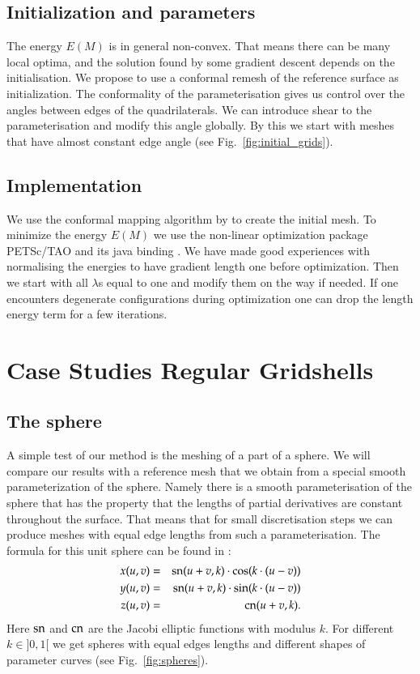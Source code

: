 \documentclass[Thesis.tex]{subfiles}
\begin{document}
\subsection{Initialization and parameters}
The energy $E(M)$ is in general non-convex. That means there can be many local optima, and the solution found by some gradient descent depends on the initialisation. We propose to use a conformal remesh of the reference surface as initialization. The conformality of the parameterisation gives us control over the angles between edges of the quadrilaterals. We can introduce shear to the parameterisation and modify this angle globally. By this we start with meshes that have almost constant edge angle (see Fig.~\ref{fig:initial_grids}).

\subsection{Implementation}
We use the conformal mapping algorithm by \cite{Springborn2008} to create the
initial mesh. To minimize the energy $E(M)$ we use the non-linear optimization package
PETSc/TAO \cite{petsc-web-page,tao-user-ref} and its java binding 
\cite{jpetsctao-web-page}. We have made good experiences with normalising the
 energies to have gradient length one before optimization. Then we start with all
$\lambda$s equal to one and modify them on the way if needed. If one encounters
degenerate configurations during optimization one can drop the length energy term for 
a few iterations.

\section{Case Studies Regular Gridshells}

\subsection{The sphere}
A simple test of our method is the meshing of a part of a sphere. We will compare our results with a reference mesh that we obtain from a special smooth parameterization of the sphere. Namely there is a smooth parameterisation of the sphere that has the property that the lengths of partial derivatives are constant throughout the surface. That means that for small discretisation steps we can produce meshes with equal edge lengths from such a parameterisation. The formula for this unit sphere can be found in \cite{Voss1881}:
\begin{eqnarray*}
	x(u,v)&=&\operatorname{sn}(u+v, k)\cdot \cos(k\cdot (u-v))\\
	y(u,v)&=&\operatorname{sn}(u+v, k)\cdot \sin(k\cdot (u-v))\\
	z(u,v)&=&\operatorname{cn}(u+v, k).
\end{eqnarray*}
Here $\operatorname{sn}$ and $\operatorname{cn}$ are the Jacobi elliptic functions with modulus $k$. For different $k\in ]0,1[$ we get spheres with equal edges lengths and different shapes of parameter curves (see Fig.~\ref{fig:spheres}).
\end{document}
